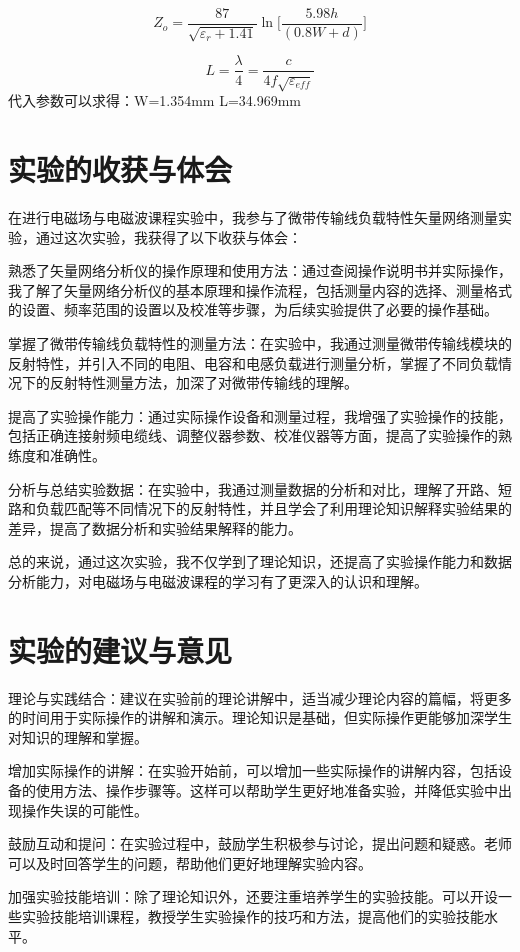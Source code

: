 \documentclass[12pt,hyperref,a4paper,UTF8]{ctexart}
\begin{document}
\begin{equation}Z_{o}=\frac{87}{\sqrt{\varepsilon_{r}+1.41}}\ln\biggl[\frac{5.98h}{(0.8W+d)}\biggr]\end{equation}

\begin{equation}L=\frac\lambda4=\frac c{4f\sqrt{\varepsilon_{eff}}}\end{equation}
代入参数可以求得：W=1.354mm L=34.969mm
\section{实验的收获与体会}
在进行电磁场与电磁波课程实验中，我参与了微带传输线负载特性矢量网络测量实验，通过这次实验，我获得了以下收获与体会：

熟悉了矢量网络分析仪的操作原理和使用方法：通过查阅操作说明书并实际操作，我了解了矢量网络分析仪的基本原理和操作流程，包括测量内容的选择、测量格式的设置、频率范围的设置以及校准等步骤，为后续实验提供了必要的操作基础。

掌握了微带传输线负载特性的测量方法：在实验中，我通过测量微带传输线模块的反射特性，并引入不同的电阻、电容和电感负载进行测量分析，掌握了不同负载情况下的反射特性测量方法，加深了对微带传输线的理解。

提高了实验操作能力：通过实际操作设备和测量过程，我增强了实验操作的技能，包括正确连接射频电缆线、调整仪器参数、校准仪器等方面，提高了实验操作的熟练度和准确性。

分析与总结实验数据：在实验中，我通过测量数据的分析和对比，理解了开路、短路和负载匹配等不同情况下的反射特性，并且学会了利用理论知识解释实验结果的差异，提高了数据分析和实验结果解释的能力。

总的来说，通过这次实验，我不仅学到了理论知识，还提高了实验操作能力和数据分析能力，对电磁场与电磁波课程的学习有了更深入的认识和理解。
\section{实验的建议与意见}
理论与实践结合：建议在实验前的理论讲解中，适当减少理论内容的篇幅，将更多的时间用于实际操作的讲解和演示。理论知识是基础，但实际操作更能够加深学生对知识的理解和掌握。

增加实际操作的讲解：在实验开始前，可以增加一些实际操作的讲解内容，包括设备的使用方法、操作步骤等。这样可以帮助学生更好地准备实验，并降低实验中出现操作失误的可能性。

鼓励互动和提问：在实验过程中，鼓励学生积极参与讨论，提出问题和疑惑。老师可以及时回答学生的问题，帮助他们更好地理解实验内容。

加强实验技能培训：除了理论知识外，还要注重培养学生的实验技能。可以开设一些实验技能培训课程，教授学生实验操作的技巧和方法，提高他们的实验技能水平。


\end{document}
